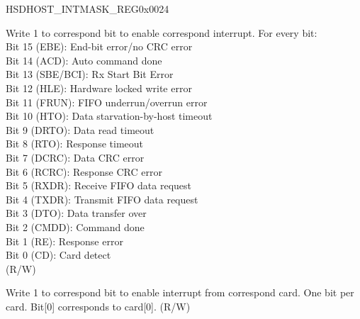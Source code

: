 \begin{register}{H}{SDHOST\_INTMASK\_REG}{0x0024}\label{regdesc:SDHOSTINTMASKREG}
%
%
%
\regnewline%
\begin{regdesc}\begin{reglist}
\label{fielddesc:SDHOSTINTMASK}\item [SDHOST\_INT\_MASK] Write 1 to correspond bit to enable correspond interrupt. For every bit:\\
Bit 15 (EBE): End-bit error/no CRC error\\
Bit 14 (ACD): Auto command done\\
Bit 13 (SBE/BCI): Rx Start Bit Error\\
Bit 12 (HLE): Hardware locked write error\\
Bit 11 (FRUN): FIFO underrun/overrun error\\
Bit 10 (HTO): Data starvation-by-host timeout\\
Bit 9 (DRTO): Data read timeout\\
Bit 8 (RTO): Response timeout\\
Bit 7 (DCRC): Data CRC error\\
Bit 6 (RCRC): Response CRC error\\
Bit 5 (RXDR): Receive FIFO data request\\
Bit 4 (TXDR): Transmit FIFO data request\\
Bit 3 (DTO): Data transfer over\\
Bit 2 (CMDD): Command done\\
Bit 1 (RE): Response error\\
Bit 0 (CD): Card detect\\ (R/W)
\label{fielddesc:SDHOSTSDIOINTMASK}\item [SDHOST\_SDIO\_INT\_MASK] Write 1 to correspond bit to enable interrupt from correspond card. One bit per card. Bit[0] corresponds to card[0]. (R/W)
\end{reglist}\end{regdesc}
\end{register}


